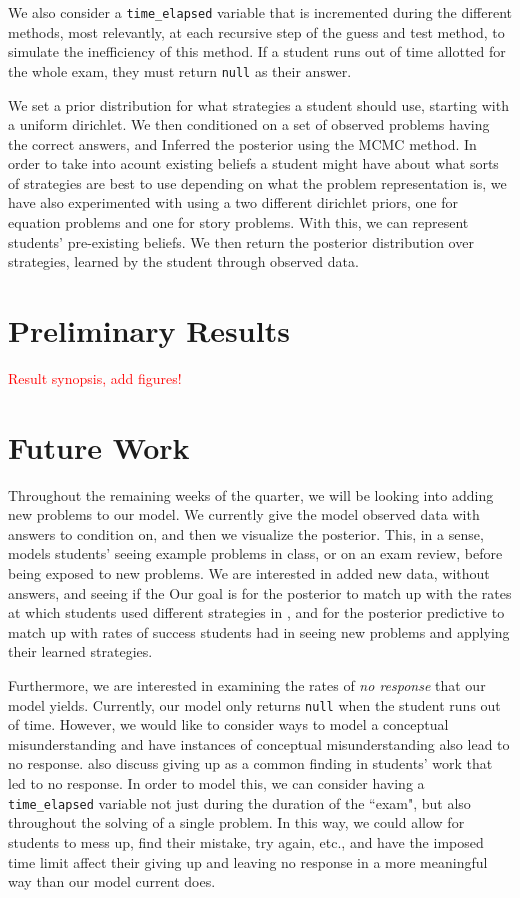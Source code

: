 \documentclass[10pt,letterpaper]{article}
\newcommand\TODO[1]{\textcolor{red}{#1}}
\begin{document}
	We also consider a \verb|time_elapsed| variable that is incremented during the different methods, most relevantly, at each recursive step of the guess and test method, to simulate the inefficiency of this method. If a student runs out of time allotted for the whole exam, they must return \verb|null| as their answer.
	
	We set a prior distribution for what strategies a student should use, starting with a uniform dirichlet. We then conditioned on a set of observed problems having the correct answers, and Inferred the posterior using the MCMC method. In order to take into acount existing beliefs a student might have about what sorts of strategies are best to use depending on what the problem representation is, we have also experimented with using a two different dirichlet priors, one for equation problems and one for story problems. With this, we can represent students' pre-existing beliefs. We then return the posterior distribution over strategies, learned by the student through observed data.
	
	
	
	\section{Preliminary Results}
	\TODO{Result synopsis, add figures!}
	
	\section{Future Work}
	Throughout the remaining weeks of the quarter, we will be looking into adding new problems to our model. We currently give the model observed data with answers to condition on, and then we visualize the posterior. This, in a sense, models students' seeing example problems in class, or on an exam review, before being exposed to new problems. We are interested in added new data, without answers, and seeing if the 
	Our goal is for the posterior to match up with the rates at which students used different strategies in \cite{KoedNath2004, KoedNath2008}, and for the posterior predictive to match up with rates of success students had in seeing new problems and applying their learned strategies. 
	
	Furthermore, we are interested in examining the rates of \textit{no response} that our model yields. Currently, our model only returns \verb|null| when the student runs out of time. However, we would like to consider ways to model a conceptual misunderstanding and have instances of conceptual misunderstanding also lead to no response.  also discuss giving up as a common finding in students' work that led to no response. In order to model this, we can consider having a \verb|time_elapsed| variable not just during the duration of the ``exam", but also throughout the solving of a single problem. In this way, we could allow for students to mess up, find their mistake, try again, etc., and have the imposed time limit affect their giving up and leaving no response in a more meaningful way than our model current does.
	
\end{document}
